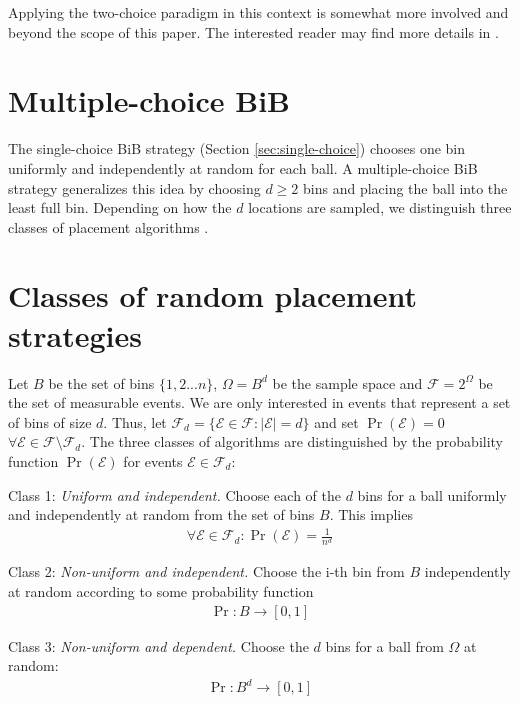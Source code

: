 \documentclass[a4paper,12pt]{article}
\begin{document}
Applying the two-choice paradigm in this context is somewhat more involved and beyond the scope of this paper. The interested reader may find more details in \cite{CMM+98}.

\section{Multiple-choice BiB}
\label{sec:multiple-choice}
The single-choice BiB strategy (Section \ref{sec:single-choice}) chooses one bin uniformly and independently at random for each ball. A multiple-choice BiB strategy generalizes this idea by  choosing $d \geq 2$ bins and placing the ball into the least full bin. Depending on how the $d$ locations are sampled, we distinguish three classes of placement algorithms \cite{VOC03}. 

\section{Classes of random placement strategies}
\label{sec:classesOfPlacement}
Let $B$ be the set of bins $\{1,2...n\}$, $\Omega = B^{d}$ be the sample space and $\mathcal{F} = 2^{\Omega}$ be the set of measurable events. We are only interested in events that represent a set of bins of size $d$. Thus, let $\mathcal{F}_d = \{\mathcal{E} \in \mathcal{F}: \left\vert \mathcal{E} \right\vert = d\}$ and set $\Pr\left(\mathcal{E}  \right) = 0$  $\forall \mathcal{E} \in \mathcal{F} \setminus \mathcal{F}_d $. The three classes of algorithms are distinguished by the probability function $\Pr\left(\mathcal{E}\right)$ for events $\mathcal{E} \in \mathcal{F}_d$:
\begin{compactitem}
\item  Class 1: \emph{Uniform and independent.} Choose each of the $d$ bins for a ball uniformly and independently at random from the set of bins $B$. This implies 
\begin{align*}
\forall \mathcal{E} \in \mathcal{F}_d: \Pr\left(\mathcal{E}\right) = \frac{1}{n ^{d}}
\end{align*}
\item Class 2: \emph{Non-uniform and independent.} Choose the i-th bin from $B$ independently at random according to some probability function
\begin{align*}
\Pr: B \rightarrow \left[0,1\right]
\end{align*}

\item Class 3: \emph{Non-uniform and dependent.} Choose the $d$ bins for a ball from $\Omega$ at random:
\begin{align*}
\Pr: B^{d} \rightarrow \left[0,1\right]
\end{align*}
\end{compactitem} 
 
\end{document}
